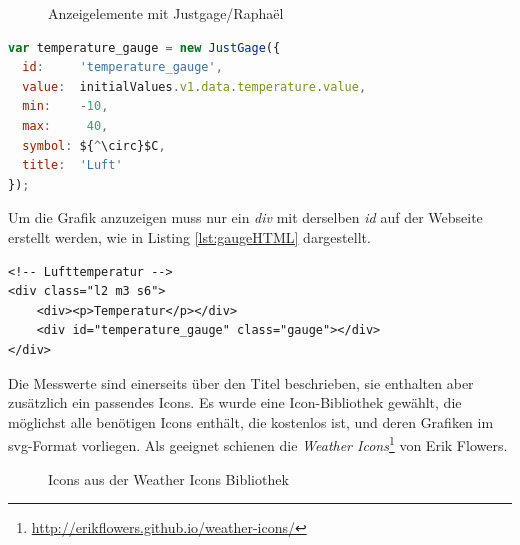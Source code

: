 \begin{figure}[h!]
	\centering
	\caption{Anzeigelemente mit Justgage/Raphaël}
	\label{img:gauges}
\end{figure}




\begin{lstlisting}[label=lst:gaugeJS,caption=Konfiguration der Gauge, language=JavaScript, mathescape, style=htmlcssjs]
var temperature_gauge = new JustGage({
  id:     'temperature_gauge',
  value:  initialValues.v1.data.temperature.value,
  min:    -10,
  max:     40,
  symbol: ${^\circ}$C,
  title:  'Luft'
});
\end{lstlisting}

Um die Grafik anzuzeigen muss nur ein \emph{div} mit derselben \emph{id} auf der Webseite erstellt werden, wie in Listing \ref{lst:gaugeHTML} dargestellt.

\vspace{3mm}
\begin{lstlisting}[label=lst:gaugeHTML,caption=Container für die SVG-Grafik (Gauge), language=HTML5, style=htmlcssjs]
<!-- Lufttemperatur -->
<div class="l2 m3 s6">
    <div><p>Temperatur</p></div>
    <div id="temperature_gauge" class="gauge"></div>
</div>
\end{lstlisting}
\vspace{3mm}


\noindent
Die Messwerte sind einerseits über den Titel beschrieben, sie enthalten aber zusätzlich ein passendes Icons. Es wurde eine Icon-Bibliothek gewählt, die möglichst alle benötigen Icons enthält, die kostenlos ist, und deren Grafiken im svg-Format vorliegen. Als geeignet schienen die \textit{Weather Icons}\footnote{\url{http://erikflowers.github.io/weather-icons/}} von Erik Flowers.


\begin{figure}[h!]
	\centering
	\caption{Icons aus der Weather Icons Bibliothek}
	\label{img:icons}
\end{figure}






